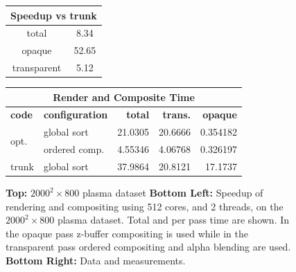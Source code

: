 \documentclass[a4paper,10pt]{report}
\begin{document}
\begin{figure}[ht]
\begin{minipage}{0.5\textwidth}
{\def\arraystretch{1.25}
\begin{tabular}{|c|c|}
\hline
\multicolumn{2}{|c|}{\bf{Speedup vs trunk}} \\ \hline
 total & 8.34 \\ \cline{1-2}
 opaque & 52.65 \\ \cline{1-2}
 transparent & 5.12 \\ \hline
\end{tabular}}\vspace{0.08in}
{\footnotesize
\def\arraystretch{1.5}
\begin{tabular}{|l|l|r|r|r|}
\hline
\multicolumn{5}{|c|}{\bf Render and Composite Time} \\ \hline
{\bf code} & {\bf configuration} & {\bf total} & {\bf trans.} & {\bf opaque} \\ \hline
\multirow{2}{*}{opt.} & global sort & 21.0305 & 20.6666 & 0.354182 \\ \cline{2-5}
 & ordered comp. &  4.55346 & 4.06768 & 0.326197 \\ \hline
trunk & global sort & 37.9864 & 20.8121 & 17.1737 \\ \hline
\end{tabular}}
\end{minipage}
\caption{\footnotesize {\bf Top:} $2000^2 \times 800$ plasma dataset {\bf Bottom Left:} Speedup of rendering and compositing using 512 cores, and 2 threads, on the $2000^2 \times 800$ plasma dataset. Total and per pass time are shown. In the opaque pass z-buffer compositing is used while in the transparent pass ordered compositing and alpha blending are used. {\bf Bottom Right:} Data and measurements.}
\label{fig:speedup_vpic}
\end{figure}
\end{document}
